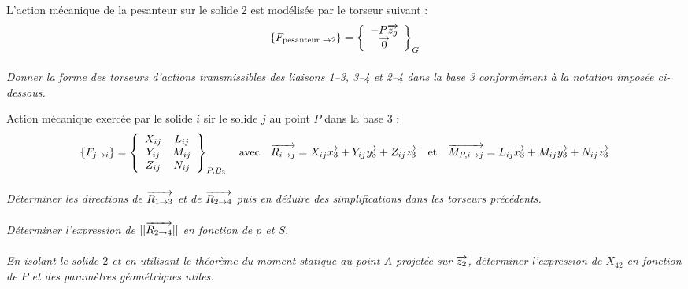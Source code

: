 \documentclass[10pt,oneside]{article}
\begin{document}
L'action mécanique de la pesanteur sur le solide 2 est modélisée par le torseur suivant :
$$
\left\{
F_{\text{pesanteur }\rightarrow 2} 
\right\}=
\left\{
\begin{array}{cc}
- P \overrightarrow{z_g} \\
\overrightarrow{0} \\
\end{array}
\right\}_{G}
$$

\paragraph{}
\textit{Donner la forme des torseurs d'actions transmissibles des liaisons 1--3, 3--4 et 2--4 dans la base 3 conformément à la notation imposée ci-dessous.}

Action mécanique exercée par le solide $i$ sir le solide $j$ au point $P$ dans la base 3 :
$$
\left\{
F_{j \rightarrow i} 
\right\}=
\left\{
\begin{array}{cc}
X_{ij} & L_{ij} \\
Y_{ij} & M_{ij} \\
Z_{ij} & N_{ij} \\
\end{array}
\right\}_{P,B_3}
\quad \text{avec} \quad
\overrightarrow{R_{i\rightarrow j}} = X_{ij}\overrightarrow{x_3}+Y_{ij}\overrightarrow{y_3}+Z_{ij}\overrightarrow{z_3} 
\quad \text{et} \quad
\overrightarrow{M_{P, i\rightarrow j}} = L_{ij}\overrightarrow{x_3}+M_{ij}\overrightarrow{y_3}+N_{ij}\overrightarrow{z_3} 
$$

\paragraph{}
\textit{Déterminer les directions de $\overrightarrow{R_{1\rightarrow 3}}$ et de $\overrightarrow{R_{2\rightarrow 4}}$ puis en déduire des simplifications dans les torseurs précédents.}

\paragraph{}
\textit{Déterminer l'expression de $||\overrightarrow{R_{2\rightarrow 4}}||$ en fonction de $p$ et $S$.}

\paragraph{}
\textit{En isolant le solide $2$ et en utilisant le théorème du moment statique au point $A$ projetée sur $\overrightarrow{z_2}$, déterminer l'expression de $X_{42}$ en fonction de $P$ et des paramètres géométriques utiles.}
\end{document}
